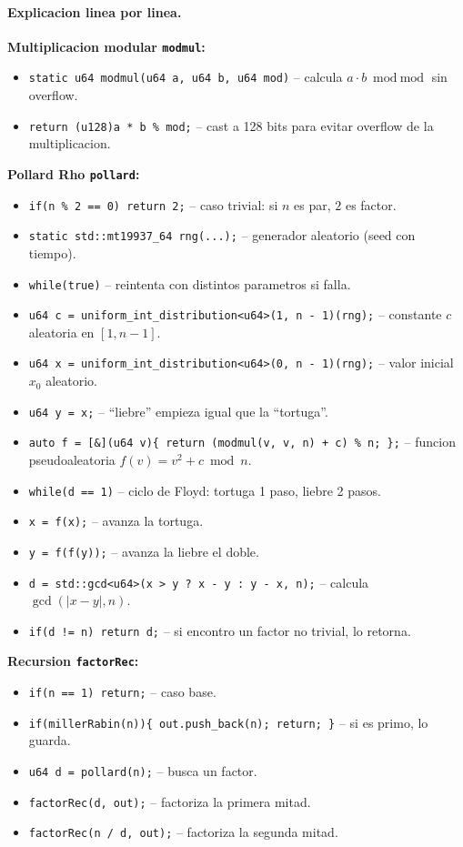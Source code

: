 \paragraph{Explicacion linea por linea.}
\textbf{Multiplicacion modular \texttt{modmul}:}
\begin{itemize}\setlength\itemsep{0pt}
	\item \verb|static u64 modmul(u64 a, u64 b, u64 mod)| -- calcula $a \cdot b \bmod \text{mod}$ sin overflow.
	\item \verb|return (u128)a * b % mod;| -- cast a 128 bits para evitar overflow de la multiplicacion.
\end{itemize}
\textbf{Pollard Rho \texttt{pollard}:}
\begin{itemize}\setlength\itemsep{0pt}
	\item \verb|if(n % 2 == 0) return 2;| -- caso trivial: si $n$ es par, $2$ es factor.
	\item \verb|static std::mt19937_64 rng(...);| -- generador aleatorio (seed con tiempo).
	\item \verb|while(true)| -- reintenta con distintos parametros si falla.
	\item \verb|u64 c = uniform_int_distribution<u64>(1, n - 1)(rng);| -- constante $c$ aleatoria en $[1, n-1]$.
	\item \verb|u64 x = uniform_int_distribution<u64>(0, n - 1)(rng);| -- valor inicial $x_0$ aleatorio.
	\item \verb|u64 y = x;| -- ``liebre'' empieza igual que la ``tortuga''.
	\item \verb|auto f = [&](u64 v){ return (modmul(v, v, n) + c) % n; };| -- funcion pseudoaleatoria $f(v) = v^2 + c \bmod n$.
	\item \verb|while(d == 1)| -- ciclo de Floyd: tortuga 1 paso, liebre 2 pasos.
	\item \verb|x = f(x);| -- avanza la tortuga.
	\item \verb|y = f(f(y));| -- avanza la liebre el doble.
	\item \verb|d = std::gcd<u64>(x > y ? x - y : y - x, n);| -- calcula $\gcd(|x-y|, n)$.
	\item \verb|if(d != n) return d;| -- si encontro un factor no trivial, lo retorna.
\end{itemize}
\textbf{Recursion \texttt{factorRec}:}
\begin{itemize}\setlength\itemsep{0pt}
	\item \verb|if(n == 1) return;| -- caso base.
	\item \verb|if(millerRabin(n)){ out.push_back(n); return; }| -- si es primo, lo guarda.
	\item \verb|u64 d = pollard(n);| -- busca un factor.
	\item \verb|factorRec(d, out);| -- factoriza la primera mitad.
	\item \verb|factorRec(n / d, out);| -- factoriza la segunda mitad.
\end{itemize}
